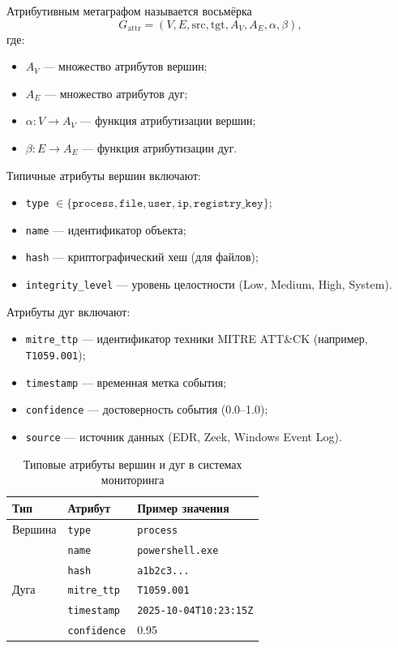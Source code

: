\documentclass{article}
\begin{document}
\begin{definition}
    Атрибутивным метаграфом называется восьмёрка
    \[
        G_{\mathrm{attr}} = (V, E, \mathrm{src}, \mathrm{tgt}, A_V, A_E, \alpha, \beta),
    \]
    где:
    \begin{itemize}
        \item $A_V$ — множество атрибутов вершин;
        \item $A_E$ — множество атрибутов дуг;
        \item $\alpha: V \rightarrow A_V$ — функция атрибутизации вершин;
        \item $\beta: E \rightarrow A_E$ — функция атрибутизации дуг.
    \end{itemize}
\end{definition}

Типичные атрибуты вершин включают:
\begin{itemize}
    \item \texttt{type} $\in \{\texttt{process}, \texttt{file}, \texttt{user}, \texttt{ip}, \texttt{registry\_key}\}$;
    \item \texttt{name} — идентификатор объекта;
    \item \texttt{hash} — криптографический хеш (для файлов);
    \item \texttt{integrity\_level} — уровень целостности (Low, Medium, High, System).
\end{itemize}

Атрибуты дуг включают:
\begin{itemize}
    \item \texttt{mitre\_ttp} — идентификатор техники MITRE ATT\&CK (например, \texttt{T1059.001});
    \item \texttt{timestamp} — временная метка события;
    \item \texttt{confidence} — достоверность события (0.0–1.0);
    \item \texttt{source} — источник данных (EDR, Zeek, Windows Event Log).
\end{itemize}



\begin{table}[h]
    \centering
    \caption{Типовые атрибуты вершин и дуг в системах мониторинга}
    \label{tab:attributes}
    \begin{tabular}{lll}
        \toprule
        Тип & Атрибут & Пример значения \\
        \midrule
        Вершина & \texttt{type} & \texttt{process} \\
                & \texttt{name} & \texttt{powershell.exe} \\
                & \texttt{hash} & \texttt{a1b2c3...} \\
        Дуга    & \texttt{mitre\_ttp} & \texttt{T1059.001} \\
                & \texttt{timestamp} & \texttt{2025-10-04T10:23:15Z} \\
                & \texttt{confidence} & 0.95 \\
        \bottomrule
    \end{tabular}
\end{table}
\end{document}
